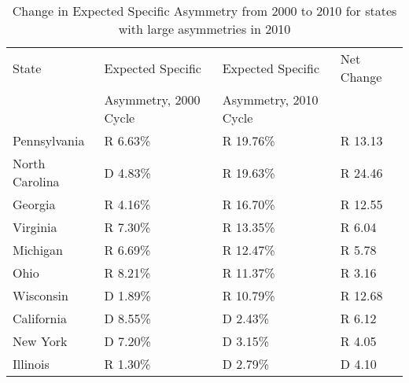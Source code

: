 \begin{table}[htb!]
\centering
\caption{Change in Expected Specific Asymmetry from 2000 to 2010 for states with large asymmetries in 2010 \label{tab:Asym2000to2010}}
\begin{tabular}{|l|l|l|l|}
\hline
State & Expected Specific     & Expected Specific & Net Change\\
      & Asymmetry, 2000 Cycle & Asymmetry, 2010 Cycle & \\
\hline
\hline
Pennsylvania & R 6.63\% & R 19.76\% & R 13.13\\
\hline
North Carolina & D 4.83\% & R 19.63\% & R 24.46\\
\hline
Georgia & R 4.16\% & R 16.70\% & R 12.55\\
\hline
Virginia & R 7.30\% & R 13.35\% & R 6.04\\
\hline
Michigan & R 6.69\% & R 12.47\% & R 5.78\\
\hline
Ohio & R 8.21\% & R 11.37\% & R 3.16\\
\hline
Wisconsin & D 1.89\% & R 10.79\% & R 12.68\\
\hline
California & D 8.55\% & D 2.43\% & R 6.12\\
\hline
New York & D 7.20\% & D 3.15\% & R 4.05\\
\hline
Illinois & R 1.30\% & D 2.79\% & D 4.10\\
\hline
\end{tabular}
\end{table}

